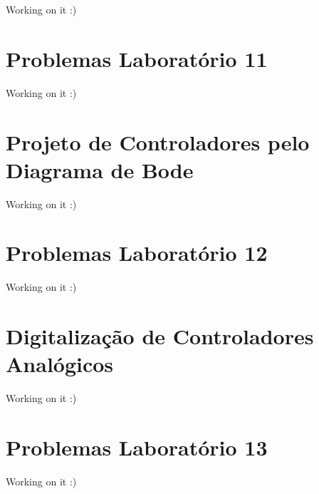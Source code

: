 \documentclass[
]{book}
\theoremstyle{definition}
\theoremstyle{definition}
\theoremstyle{definition}
\theoremstyle{remark}
\begin{document}
Working on it :)

\hypertarget{problemas-laboratuxf3rio-11}{%
\chapter*{Problemas Laboratório 11}\label{problemas-laboratuxf3rio-11}}

Working on it :)

\hypertarget{projeto-de-controladores-pelo-diagrama-de-bode}{%
\chapter{Projeto de Controladores pelo Diagrama de Bode}\label{projeto-de-controladores-pelo-diagrama-de-bode}}

Working on it :)

\hypertarget{problemas-laboratuxf3rio-12}{%
\chapter*{Problemas Laboratório 12}\label{problemas-laboratuxf3rio-12}}

Working on it :)

\hypertarget{digitalizauxe7uxe3o-de-controladores-analuxf3gicos}{%
\chapter{Digitalização de Controladores Analógicos}\label{digitalizauxe7uxe3o-de-controladores-analuxf3gicos}}

Working on it :)

\hypertarget{problemas-laboratuxf3rio-13}{%
\chapter*{Problemas Laboratório 13}\label{problemas-laboratuxf3rio-13}}

Working on it :)

  
\end{document}
